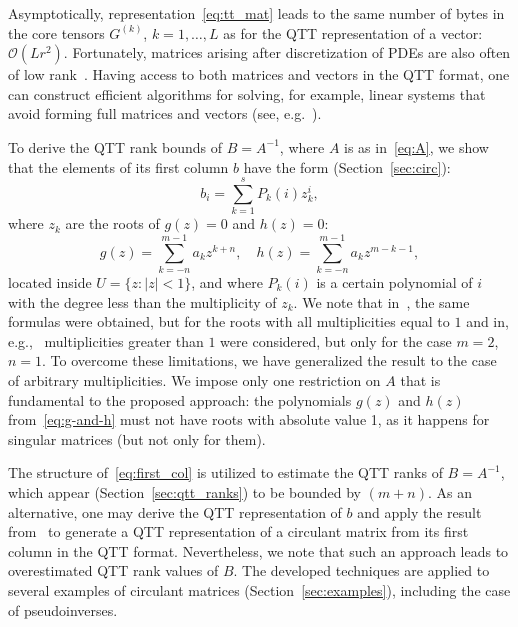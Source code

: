 \documentclass[a4paper]{article}
\newcommand{\LL}{L}
\begin{document}
{\color{blue} Asymptotically, representation~\eqref{eq:tt_mat} leads to the same number of bytes in the core tensors $G^{(k)}$, $k=1,\dots,\LL$ as for the QTT representation of a vector: $\mathcal{O}(\LL r^2)$.
Fortunately, matrices arising after discretization of PDEs are also often of low rank~\cite{khkaz-lap-2012}.
Having access to both matrices and vectors in the QTT format, one can construct efficient algorithms for solving, for example, linear systems that avoid forming full matrices and vectors (see, e.g.~\cite{ds-amen-2014}).
}


To derive the QTT rank bounds of $B=A^{-1}$, where $A$ is as in~\eqref{eq:A}, we show that the elements of its first column $b$ have the form (Section~\ref{sec:circ}):
\begin{equation}\label{eq:first_col}
     b_{i} = \sum_{k=1}^s P_{k} (i) z_k^i,
\end{equation}
where $z_k$ are the roots of $g(z)=0$ and $h(z)=0$:
\begin{equation}\label{eq:g-and-h}
    g(z) = \sum_{k=-n}^{m-1}a_{k}z^{k+n}, \quad h(z) = \sum_{k=-n}^{m-1}a_{k}z^{m-k-1},
\end{equation}
%    
located inside $U=\{z:|z|<1\}$, and where $P_k(i)$ is a certain polynomial of $i$ with the degree less than the multiplicity of $z_k$. 
We note that in~\cite{fuyong2011inverse}, the same formulas were obtained, but for the roots with all multiplicities equal to $1$ and in, e.g.,~\cite{searle1979inverting} multiplicities greater than $1$ were considered, but only for the case $m=2$, $n=1$. 
To overcome these limitations, we have generalized the result to the case of arbitrary multiplicities.
We impose only one restriction on $A$ that is fundamental to the proposed approach: the polynomials $g(z)$ and $h(z)$ from~\eqref{eq:g-and-h} must not have roots with absolute value 1, as it happens for singular matrices (but not only for them).

The structure of~\eqref{eq:first_col} is utilized to estimate the QTT ranks of $B = A^{-1}$, which appear (Section~\ref{sec:qtt_ranks}) to be bounded by $(m+n)$.
As an alternative, one may derive the QTT representation of $b$ and apply the result from~\cite{khkaz-conv-2013} to generate a QTT representation of a circulant matrix from its first column in the QTT format.
Nevertheless, we note that such an approach leads to overestimated QTT rank values of $B$.
The developed techniques are  applied to several examples of circulant matrices (Section~\ref{sec:examples}), including the case of pseudoinverses.
\end{document}
